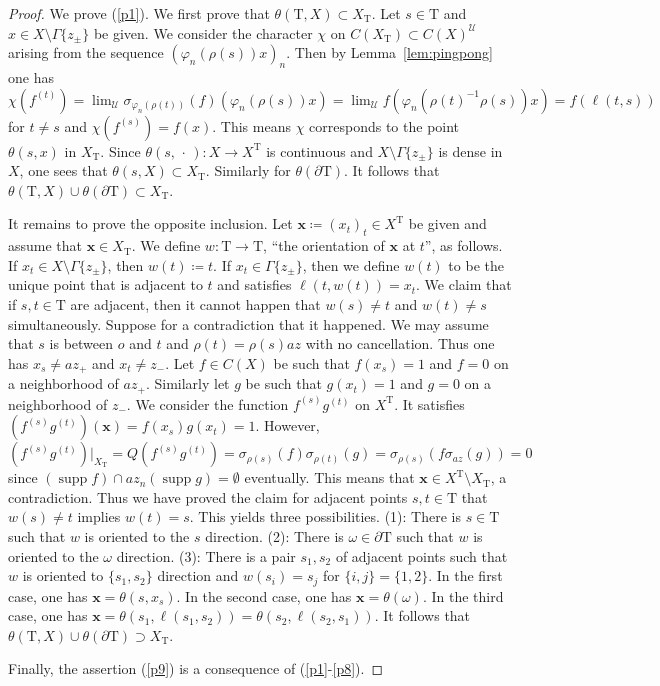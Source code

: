 \documentclass[12pt,nosumlimits,nonamelimits]{amsart}
\theoremstyle{remark}
\theoremstyle{definition}
\newcommand{\cU}{\mathcal{U}}
\newcommand{\vp}{\varphi}
\newcommand{\Ga}{\Gamma}
\newcommand{\Tree}{\mathrm{T}}
\DeclareMathOperator{\supp}{supp}
\begin{document}
\begin{proof}
We prove (\ref{p1}). 
We first prove that $\theta(\Tree,X)\subset X_\Tree$. 
Let $s\in\Tree$ and $x\in X\setminus\Ga\{z_\pm\}$ be given.
We consider the character $\chi$ on 
$C(X_\Tree)\subset C(X)^\cU$ 
arising from the sequence $(\vp_n(\rho(s))x)_n$. 
Then by Lemma~\ref{lem:pingpong} one has 
\[
\chi(f^{(t)}) = \lim\nolimits_{\cU} \sigma_{\vp_n(\rho(t))}(f)(\vp_n(\rho(s))x) 
 = \lim\nolimits_{\cU} f(\vp_n(\rho(t)^{-1}\rho(s))x) 
 = f(\ell(t,s))
\]
for $t\neq s$ and $\chi(f^{(s)})=f(x)$. 
This means $\chi$ corresponds to 
the point $\theta(s,x)$ in $X_\Tree$. 
Since $\theta(s,\,\cdot\,)\colon X\to X^\Tree$ is 
continuous and $X\setminus\Ga\{z_\pm\}$ is dense in $X$, 
one sees that $\theta(s,X)\subset X_\Tree$. 
Similarly for $\theta(\partial\Tree)$. 
It follows that $\theta(\Tree,X)\cup\theta(\partial\Tree)\subset X_\Tree$. 

It remains to prove the opposite inclusion. 
Let $\mathbf{x} \coloneq (x_t)_t\in X^\Tree$ be given and assume that 
$\mathbf{x} \in X_\Tree$. 
We define $w\colon \Tree \to \Tree$, 
``the orientation of $\mathbf{x}$ at $t$'', as follows. 
If $x_t \in X\setminus\Ga\{z_\pm\}$, then $w(t) \coloneq t$. 
If $x_t \in \Ga\{ z_\pm\}$, then we define $w(t)$ to be the unique 
point that is adjacent to $t$ and satisfies $\ell(t,w(t))=x_t$. 
We claim that if $s,t\in\Tree$ are adjacent, then 
it cannot happen that $w(s)\neq t$ and $w(t)\neq s$ simultaneously. 
Suppose for a contradiction that it happened. 
We may assume that $s$ is between $o$ and $t$ 
and $\rho(t)=\rho(s) a z$ with no cancellation. 
Thus one has $x_s \neq az_+$ and $x_t \neq z_-$. 
Let $f\in C(X)$ be such that 
$f(x_s)=1$ and $f=0$ on a neighborhood of $az_+$. 
Similarly let $g$ be such that $g(x_t)=1$ and $g=0$ 
on a neighborhood of $z_-$. 
We consider the function $f^{(s)}g^{(t)}$ on $X^\Tree$. 
It satisfies $(f^{(s)}g^{(t)})( \mathbf{x} ) = f(x_s)g(x_t) = 1$.
However, 
\[
(f^{(s)}g^{(t)})|_{X_\Tree} = Q(f^{(s)}g^{(t)}) 
 = \sigma_{\rho(s)}(f)\sigma_{\rho(t)}(g)
 = \sigma_{\rho(s)}( f \sigma_{az}(g) ) = 0
\]
since $(\supp f)  \cap az_n(\supp g) = \emptyset$ eventually. 
This means that $\mathbf{x} \in X^\Tree\setminus X_\Tree$, 
a contradiction. 
Thus we have proved the claim for adjacent 
points $s,t\in\Tree$ that $w(s)\neq t$ implies $w(t)=s$. 
This yields three possibilities. 
(1): There is $s\in \Tree$ such that $w$ is oriented to 
the $s$ direction. 
(2): There is $\omega\in\partial\Tree$ such that 
$w$ is oriented to the $\omega$ direction. 
(3): There is a pair $s_1,s_2$ of adjacent points such that 
$w$ is oriented to $\{s_1,s_2\}$ direction 
and $w(s_i)=s_j$ for $\{ i, j \}=\{1,2\}$. 
In the first case, one has $\mathbf{x}=\theta(s,x_s)$. 
In the second case, one has $\mathbf{x}=\theta(\omega)$. 
In the third case, one has $\mathbf{x}=\theta(s_1,\ell(s_1,s_2))=\theta(s_2,\ell(s_2,s_1))$.
It follows that $\theta(\Tree,X)\cup\theta(\partial\Tree)\supset X_\Tree$. 

Finally, the assertion (\ref{p9}) is a consequence of (\ref{p1}-\ref{p8}).
\end{proof}
\end{document}
